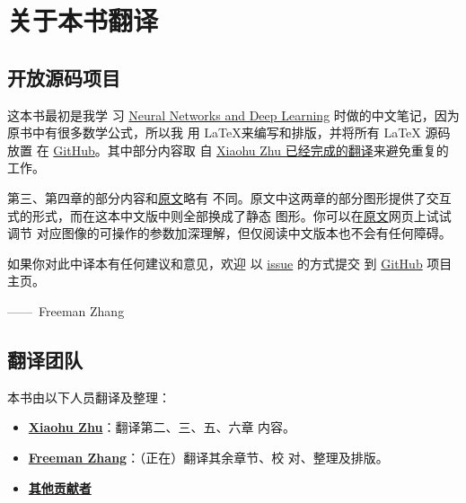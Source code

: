 
\chapter{关于本书翻译}
\label{ch:TranslationTeam}

\section*{开放源码项目}

这本书最初是我学
习 \href{http://neuralnetworksanddeeplearning.com/index.html}{Neural Networks
  and Deep Learning} 时做的中文笔记，因为原书中有很多数学公式，所以我
用 \LaTeX{}来编写和排版，并将所有 \LaTeX{} 源码放置
在 \href{https://github.com/zhanggyb/nndl}{GitHub}。其中部分内容取
自
\href{https://github.com/tigerneil/neural-networks-and-deep-learning-zh-cn}{Xiaohu
  Zhu 已经完成的翻译}来避免重复的工作。

第三、第四章的部分内容和\href{http://neuralnetworksanddeeplearning.com}{原文}略有
不同。原文中这两章的部分图形提供了交互式的形式，而在这本中文版中则全部换成了静态
图形。你可以在\href{http://neuralnetworksanddeeplearning.com}{原文}网页上试试调节
对应图像的可操作的参数加深理解，但仅阅读中文版本也不会有任何障碍。

如果你对此中译本有任何建议和意见，欢迎
以 \href{https://github.com/zhanggyb/nndl/issues}{issue} 的方式提交
到 \href{https://github.com/zhanggyb/nndl}{GitHub} 项目主页。

\begin{flushright}
  ——~Freeman Zhang
\end{flushright}

\section*{翻译团队}
\label{sec:TranslationTeam}

本书由以下人员翻译及整理：

\begin{itemize}
\item \textbf{\href{mailto:xhzhu.nju@gmail}{Xiaohu Zhu}}：翻译第二、三、五、六章
  内容。
\item \textbf{\href{mailto:zhanggyb@gmail.com}{Freeman Zhang}}：（正在）翻译其余章节、校
  对、整理及排版。
\item \textbf{\href{https://github.com/zhanggyb/nndl/graphs/contributors}{其他贡献者}}
\end{itemize}
